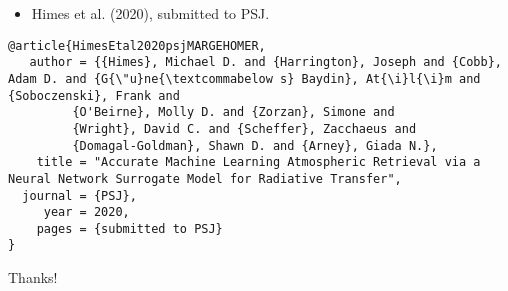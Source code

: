 \documentclass[letterpaper, 12pt]{article}
\begin{document}
\begin{itemize}
\item Himes et al. (2020), submitted to PSJ.
\end{itemize}

\begin{verbatim}
@article{HimesEtal2020psjMARGEHOMER,
   author = {{Himes}, Michael D. and {Harrington}, Joseph and {Cobb}, Adam D. and {G{\"u}ne{\textcommabelow s} Baydin}, At{\i}l{\i}m and {Soboczenski}, Frank and
         {O'Beirne}, Molly D. and {Zorzan}, Simone and
         {Wright}, David C. and {Scheffer}, Zacchaeus and
         {Domagal-Goldman}, Shawn D. and {Arney}, Giada N.},
    title = "Accurate Machine Learning Atmospheric Retrieval via a Neural Network Surrogate Model for Radiative Transfer",
  journal = {PSJ},
     year = 2020,
    pages = {submitted to PSJ}
}
\end{verbatim}

\noindent Thanks!


\end{document}
